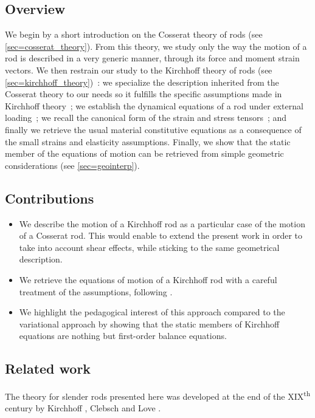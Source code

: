 \subsection{Overview}

We begin by a short introduction on the Cosserat theory of rods (see \cref{sec=cosserat_theory}). From this theory, we study only the way the motion of a rod is described in a very generic manner, through its force and moment strain vectors. We then restrain our study to the Kirchhoff theory of rods (see \cref{sec=kirchhoff_theory})~: we specialize the description inherited from the Cosserat theory to our needs so it fulfills the specific assumptions made in Kirchhoff theory~; we establish the dynamical equations of a rod under external loading~; we recall the canonical form of the strain and stress tensors~; and finally we retrieve the usual material constitutive equations as a consequence of the small strains and elasticity assumptions. Finally, we show that the static member of the equations of motion can be retrieved from simple geometric considerations (see \cref{sec=geointerp}).

\subsection{Contributions}
\begin{itemize}
\item We describe the motion of a Kirchhoff rod as a particular case of the motion of a Cosserat rod. This would enable to extend the present work in order to take into account shear effects, while sticking to the same geometrical description.
\item We retrieve the equations of motion of a Kirchhoff rod with a careful treatment of the assumptions, following \cite{Dill1992}.
\item We highlight the pedagogical interest of this approach compared to the variational approach by showing that the static members of Kirchhoff equations are nothing but first-order balance equations.
\end{itemize}

\subsection{Related work}

The theory for slender rods presented here was developed at the end of the XIX\textsuperscript{th} century by Kirchhoff \cite{Kirchhoff1850,Kirchhoff1876}, Clebsch \cite{Clebsch1883} and Love \cite{Love1906}.

